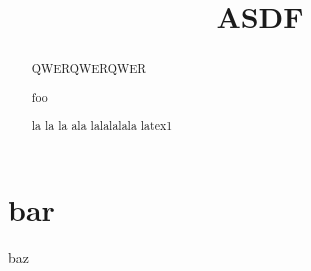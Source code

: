 \documentclass[a4paper,10pt]{article}
\title{ASDF}
\author{}
\begin{document}
\maketitle

\begin{abstract}
  QWERQWERQWER

  foo

la la la ala lalalalala latex1
\end{abstract}

\section{bar}
baz
\end{document}
